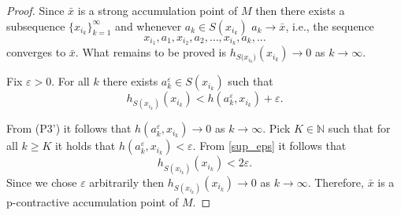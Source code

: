 \documentclass[10pt,a4paper]{amsart}
\newcommand{\N}{\mathbb{N}}
\begin{document}
\begin{proof} Since $\bar{x}$ is a strong accumulation point of $M$ then there exists a subsequence $\{x_{i_k}\}_{k=1}^{\infty}$ and whenever $a_k \in S(x_{i_k})$  $a_k \rightarrow \bar{x}$, i.e., the sequence
\[x_{i_1},a_1,x_{i_2},a_2,\dots,x_{i_k},a_k,\dots\]
converges to $\bar{x}$.
What remains to be proved is $h_{{S(x_{i_k}})}(x_{i_k}) \rightarrow 0$ as $k \rightarrow \infty$.

Fix $\varepsilon>0$. For all $k$ there exists $a_k^{\varepsilon} \in S(x_{i_k})$ such that
\begin{equation} \label{sup_eps}
h_{S(x_{i_k})}(x_{i_k})<h(a_k^{\varepsilon},x_{i_k})+\varepsilon.
\end{equation}

From (P3') it follows that $h(a_k^{\varepsilon}, x_{i_k}) \rightarrow 0$ as $k \rightarrow \infty$. Pick $K \in \N$ such that for all $k \geq K$ it holds that $h(a_k^{\varepsilon}, x_{i_k}) < \varepsilon$. From \ref{sup_eps} it follows that 
\[
h_{S(x_{i_k})}(x_{i_k})<2\varepsilon. 
\]
Since we chose $\varepsilon$ arbitrarily then $h_{S(x_{i_k})}(x_{i_k}) \rightarrow 0$ as $k \rightarrow \infty$. Therefore, $\bar{x}$ is a p-contractive accumulation point of $M$.
\end{proof}
\end{document}
